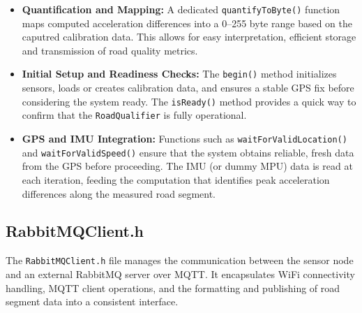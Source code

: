 \begin{itemize}
    \item \textbf{Quantification and Mapping:}  
    A dedicated \texttt{quantifyToByte()} function maps computed acceleration differences into a 0–255 byte range based on the caputred calibration data. This allows for easy interpretation, efficient storage and transmission of road quality metrics.

    \item \textbf{Initial Setup and Readiness Checks:}  
    The \texttt{begin()} method initializes sensors, loads or creates calibration data, and ensures a stable GPS fix before considering the system ready. The \texttt{isReady()} method provides a quick way to confirm that the \texttt{RoadQualifier} is fully operational.

    \item \textbf{GPS and IMU Integration:}  
    Functions such as \texttt{waitForValidLocation()} and \texttt{waitForValidSpeed()} ensure that the system obtains reliable, fresh data from the GPS before proceeding. The IMU (or dummy MPU) data is read at each iteration, feeding the computation that identifies peak acceleration differences along the measured road segment.
\end{itemize}

\subsection{RabbitMQClient.h}

The \texttt{RabbitMQClient.h} file manages the communication between the sensor node and an external RabbitMQ server over MQTT. It encapsulates WiFi connectivity handling, MQTT client operations, and the formatting and publishing of road segment data into a consistent interface.

